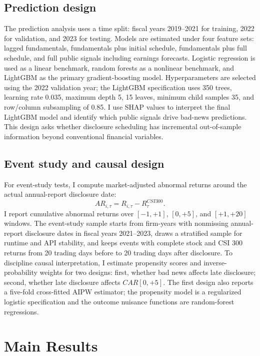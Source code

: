 \documentclass[10pt]{article}
\begin{document}
\subsection{Prediction design}

The prediction analysis uses a time split: fiscal years 2019--2021 for training, 2022 for validation, and 2023 for testing. Models are estimated under four feature sets: lagged fundamentals, fundamentals plus initial schedule, fundamentals plus full schedule, and full public signals including earnings forecasts. Logistic regression is used as a linear benchmark, random forests as a nonlinear benchmark, and LightGBM as the primary gradient-boosting model. Hyperparameters are selected using the 2022 validation year; the LightGBM specification uses 350 trees, learning rate 0.035, maximum depth 5, 15 leaves, minimum child samples 35, and row/column subsampling of 0.85. I use SHAP values to interpret the final LightGBM model and identify which public signals drive bad-news predictions. This design asks whether disclosure scheduling has incremental out-of-sample information beyond conventional financial variables.

\subsection{Event study and causal design}

For event-study tests, I compute market-adjusted abnormal returns around the actual annual-report disclosure date:
\begin{equation}
AR_{i,\tau} = R_{i,\tau} - R^{CSI300}_{\tau}.
\end{equation}
I report cumulative abnormal returns over $[-1,+1]$, $[0,+5]$, and $[+1,+20]$ windows. The event-study sample starts from firm-years with nonmissing annual-report disclosure dates in fiscal years 2021--2023, draws a stratified sample for runtime and API stability, and keeps events with complete stock and CSI 300 returns from 20 trading days before to 20 trading days after disclosure. To discipline causal interpretation, I estimate propensity scores and inverse-probability weights for two designs: first, whether bad news affects late disclosure; second, whether late disclosure affects $CAR[0,+5]$. The first design also reports a five-fold cross-fitted AIPW estimator; the propensity model is a regularized logistic specification and the outcome nuisance functions are random-forest regressions.

\section{Main Results}
\end{document}
